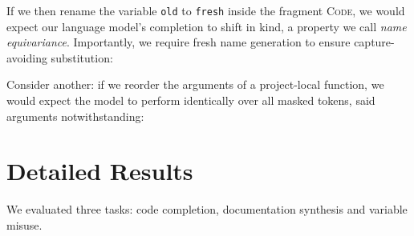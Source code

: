 \documentclass[usenames,dvipsnames]{article} %
\begin{document}
  If we then rename the variable \texttt{old} to \texttt{fresh} inside the fragment \textsc{Code}, we would expect our language model's completion to shift in kind, a property we call \textit{name equivariance}. Importantly, we require fresh name generation to ensure capture-avoiding substitution:

  \begin{center}
    \begin{prooftree}
    \end{prooftree}
  \end{center}

  Consider another: if we reorder the arguments of a project-local function, we would expect the model to perform identically over all masked tokens, said arguments notwithstanding:

  \begin{center}
    \begin{prooftree}
    \end{prooftree}
  \end{center}

  \pagebreak\section{Detailed Results}\label{sec:detailed_results}

  We evaluated three tasks: code completion, documentation synthesis and variable misuse.
\end{document}
